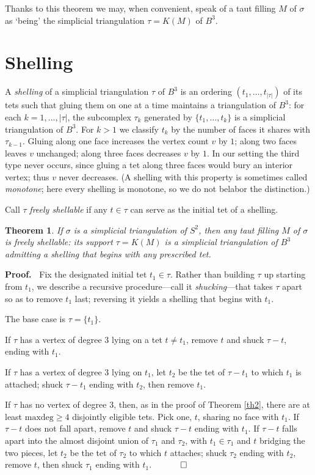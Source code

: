 \documentclass[12pt]{article}
\newtheorem{theorem}{Theorem}
\newcommand{\proofstart}{{\noindent \bf Proof.\ }}
\newcommand{\proofend}{$\quad \qed$}
\newcommand{\kw}{\mathrm}
\newcommand{\maxdeg}{\kw{maxdeg}}
\begin{document}
Thanks to this theorem we may, when convenient, speak of a taut filling
$M$ of $\sigma$ as `being' the simplicial triangulation $\tau=K(M)$ of
$B^3$.

\section{Shelling}

A \emph{shelling} of a simplicial triangulation $\tau$ of $B^3$ is an
ordering $(t_1,\ldots,t_{|\tau|})$ of its tets such that gluing them on
one at a time maintains a triangulation of $B^3$: for each
$k=1,\ldots,|\tau|$, the subcomplex $\tau_k$ generated by
$\{t_1,\ldots,t_k\}$ is a simplicial triangulation of $B^3$.
For $k>1$ we classify $t_k$ by the number of faces it shares with
$\tau_{k-1}$. Gluing along one face increases the vertex count $v$ by
$1$; along two faces leaves $v$ unchanged; along three faces decreases
$v$ by $1$. In our setting the third type never occurs, since gluing a
tet along three faces would bury an interior vertex; thus $v$ never
decreases. (A shelling with this property is sometimes called
\emph{monotone}; here every shelling is monotone, so we do not belabor
the distinction.)

Call $\tau$ \emph{freely shellable} if any $t \in \tau$ can serve as the
initial tet of a shelling.

\begin{theorem} \label{th3}
If $\sigma$ is a simplicial triangulation of $S^2$, then any taut filling
$M$ of $\sigma$ is freely shellable: its support $\tau=K(M)$ is a
simplicial triangulation of $B^3$ admitting a shelling that begins with
any prescribed tet.
\end{theorem}

\proofstart
Fix the designated initial tet $t_1 \in \tau$. Rather than building
$\tau$ up starting from $t_1$, we describe a recursive procedure---call
it \emph{shucking}---that takes $\tau$ apart so as to remove $t_1$ last;
reversing it yields a shelling that begins with $t_1$.

The base case is $\tau = \{t_1\}$.

If $\tau$ has a vertex of degree $3$ lying on a tet $t \neq t_1$, remove
$t$ and shuck $\tau-t$, ending with $t_1$.

If $\tau$ has a vertex of degree $3$ lying on $t_1$, let $t_2$ be the tet
of $\tau-t_1$ to which $t_1$ is attached; shuck $\tau-t_1$ ending with
$t_2$, then remove $t_1$.

If $\tau$ has no vertex of degree $3$, then, as in the proof of
Theorem \ref{th2}, there are at least $\maxdeg \geq 4$ disjointly eligible
tets. Pick one, $t$, sharing no face with $t_1$. If $\tau-t$ does not fall
apart, remove $t$ and shuck $\tau-t$ ending with $t_1$. If $\tau-t$ falls
apart into the almost disjoint union of $\tau_1$ and $\tau_2$, with
$t_1 \in \tau_1$ and $t$ bridging the two pieces, let $t_2$ be the tet of
$\tau_2$ to which $t$ attaches; shuck $\tau_2$ ending with $t_2$, remove
$t$, then shuck $\tau_1$ ending with $t_1$.
\proofend
\end{document}
